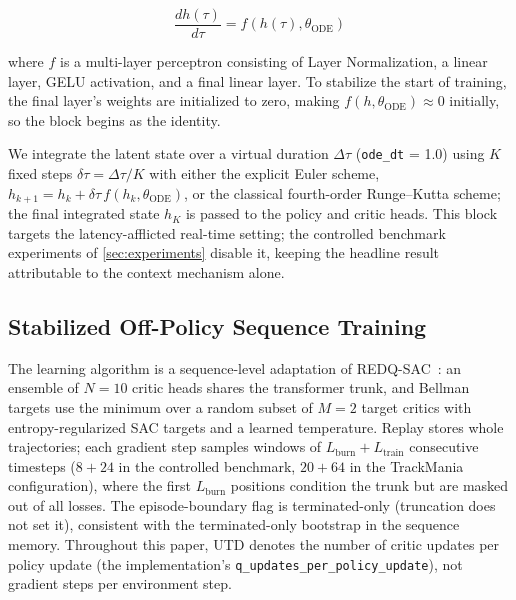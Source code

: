 \documentclass[conference]{IEEEtran}
\begin{document}
\begin{equation}

    \frac{dh(\tau)}{d\tau} = f(h(\tau), \theta_{\text{ODE}})

\end{equation}

where $f$ is a multi-layer perceptron consisting of Layer Normalization, a linear layer, GELU activation, and a final linear layer. To stabilize the start of training, the final layer's weights are initialized to zero, making $f(h, \theta_{\text{ODE}}) \approx 0$ initially, so the block begins as the identity.



We integrate the latent state over a virtual duration $\Delta\tau$ (\texttt{ode\_dt} = 1.0) using $K$ fixed steps $\delta\tau = \Delta\tau / K$ with either the explicit Euler scheme, $h_{k+1} = h_k + \delta\tau \, f(h_k, \theta_{\text{ODE}})$, or the classical fourth-order Runge--Kutta scheme; the final integrated state $h_K$ is passed to the policy and critic heads. This block targets the latency-afflicted real-time setting; the controlled benchmark experiments of \cref{sec:experiments} disable it, keeping the headline result attributable to the context mechanism alone.



\subsection{Stabilized Off-Policy Sequence Training}

\label{sec:training}

The learning algorithm is a sequence-level adaptation of REDQ-SAC~\cite{redq,sac}: an ensemble of $N = 10$ critic heads shares the transformer trunk, and Bellman targets use the minimum over a random subset of $M = 2$ target critics with entropy-regularized SAC targets and a learned temperature. Replay stores whole trajectories; each gradient step samples windows of $L_{\text{burn}} + L_{\text{train}}$ consecutive timesteps ($8 + 24$ in the controlled benchmark, $20 + 64$ in the TrackMania configuration), where the first $L_{\text{burn}}$ positions condition the trunk but are masked out of all losses. The episode-boundary flag is terminated-only (truncation does not set it), consistent with the terminated-only bootstrap in the sequence memory. Throughout this paper, UTD denotes the number of critic updates per policy update (the implementation's \texttt{q\_updates\_per\_policy\_update}), not gradient steps per environment step.
\end{document}
